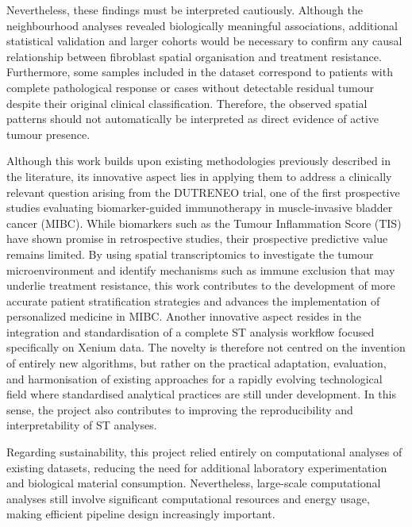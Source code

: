Nevertheless, these findings must be interpreted cautiously. Although the neighbourhood analyses revealed biologically meaningful associations, additional statistical validation and larger cohorts would be necessary to confirm any causal relationship between fibroblast spatial organisation and treatment resistance. Furthermore, some samples included in the dataset correspond to patients with complete pathological response or cases without detectable residual tumour despite their original clinical classification. Therefore, the observed spatial patterns should not automatically be interpreted as direct evidence of active tumour presence.

Although this work builds upon existing methodologies previously described in the literature, its innovative aspect lies in applying them to address a clinically relevant question arising from the DUTRENEO trial, one of the first prospective studies evaluating biomarker-guided immunotherapy in muscle-invasive bladder cancer (MIBC). While biomarkers such as the Tumour Inflammation Score (TIS) have shown promise in retrospective studies, their prospective predictive value remains limited. By using spatial transcriptomics to investigate the tumour microenvironment and identify mechanisms such as immune exclusion that may underlie treatment resistance, this work contributes to the development of more accurate patient stratification strategies and advances the implementation of personalized medicine in MIBC. Another innovative aspect resides in the integration and standardisation of a complete ST analysis workflow focused specifically on Xenium data. The novelty is therefore not centred on the invention of entirely new algorithms, but rather on the practical adaptation, evaluation, and harmonisation of existing approaches for a rapidly evolving technological field where standardised analytical practices are still under development. In this sense, the project also contributes to improving the reproducibility and interpretability of ST analyses.  

Regarding sustainability, this project relied entirely on computational analyses of existing datasets, reducing the need for additional laboratory experimentation and biological material consumption. Nevertheless, large-scale computational analyses still involve significant computational resources and energy usage, making efficient pipeline design increasingly important.

